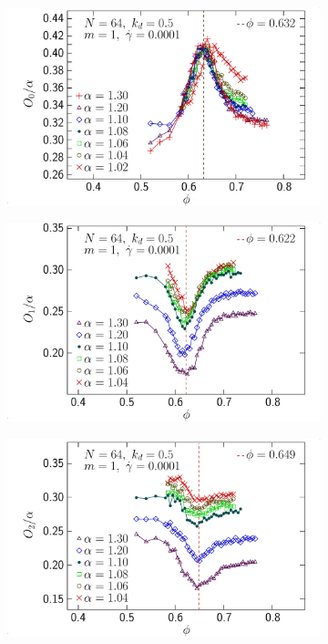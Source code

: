 \documentclass{beamer}
\begin{document}
\begin{figure}[h!]
\centering
    \begin{subfigure}[t]{0.32\textwidth}
        \centering
        \includegraphics[width=\textwidth]{figures/figs/ori0al_phi_prolate_0064_KDk500_Ml100_GDh100}
    \end{subfigure}
    \hfill
    \begin{subfigure}[t]{0.32\textwidth}
        \centering
        \includegraphics[width=\textwidth]{figures/figs/ori1al_phi_0064_KDk500_Ml100_GDh100}
    \end{subfigure}
    \hfill
    \begin{subfigure}[t]{0.32\textwidth}
        \centering
        \includegraphics[width=\textwidth]{figures/figs/ori2al_phi_0064_KDk500_Ml100_GDh100}

\end{subfigure}
\end{figure}
\end{document}
